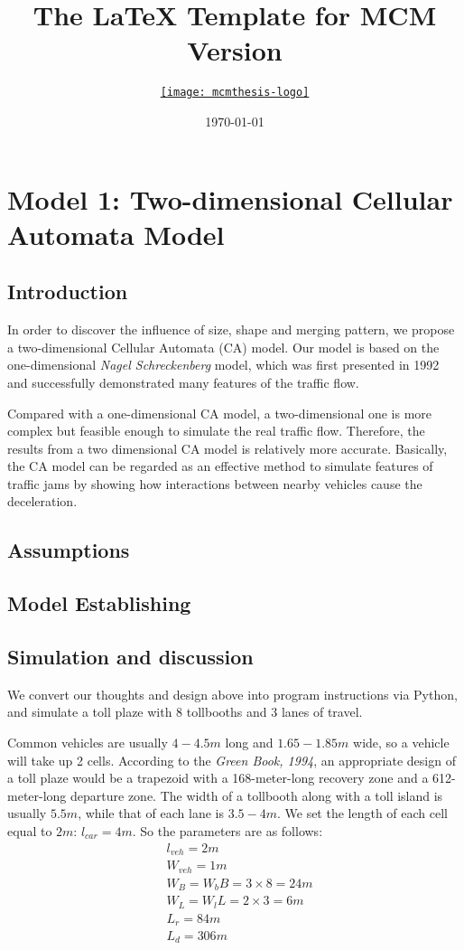 \documentclass{mcmthesis}
\title{The \LaTeX{} Template for MCM Version \MCMversion}
\author{\small \href{http://www.latexstudio.net/}
  {\texttt{[image: mcmthesis-logo]}}}
\date{\today}
\begin{document}
\section{Model 1: Two-dimensional Cellular Automata Model}
\subsection{Introduction}
In order to discover the influence of size, shape and merging pattern, we
 propose a two-dimensional Cellular Automata (CA) model. Our model is based on
 the one-dimensional \emph{Nagel Schreckenberg} model, which was first presented in
 1992 and successfully demonstrated many features of the traffic flow.

 Compared with a one-dimensional CA model, a two-dimensional one is more complex
 but feasible enough to simulate the real traffic flow. Therefore, the results
 from a two dimensional CA model is relatively more accurate.  Basically,
 the CA model can be regarded as an effective method to simulate features of
 traffic jams by showing how interactions between nearby vehicles cause the
 deceleration.
\subsection{Assumptions}

\subsection{Model Establishing}

\subsection{Simulation and discussion}
We convert our thoughts and design above into program instructions via Python,
and simulate a toll plaze with 8 tollbooths and 3 lanes of travel.

Common vehicles are usually $4-4.5m$ long and $1.65-1.85m$ wide,
so a vehicle will take up 2 cells.
According to the \emph{Green Book, 1994}, an appropriate design of
a toll plaze would be a trapezoid with a
168-meter-long recovery zone and a 612-meter-long departure zone.
The width of a tollbooth along with a toll island
is usually $5.5m$, while that of each lane is $3.5-4m$.
We set the length of each cell equal to $2m$: $l_{car}=4m$.
So the parameters are as follows:
\[
\begin{align*}
&{l}_{veh}=2m\\
&{W}_{veh}=1m\\
&W_{B}={W}_{b}B=3\times8=24m\\
&W_{L}={W}_{l}L=2\times3=6m\\
&{L}_{r}=84m\\
&{L}_{d}=306m
\end{align*}
\]
\end{document}
